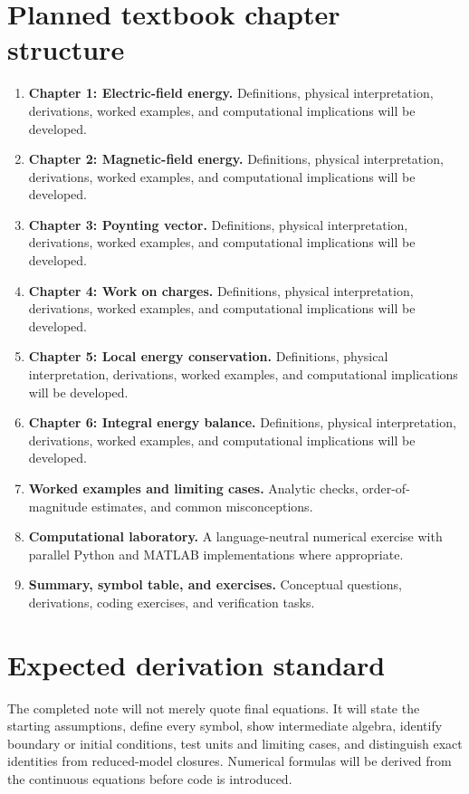 \documentclass[11pt]{article}
\begin{document}
\section{Planned textbook chapter structure}
\begin{enumerate}[leftmargin=1.8em]
\item \textbf{Chapter 1: Electric-field energy.} Definitions, physical interpretation, derivations, worked examples, and computational implications will be developed.
\item \textbf{Chapter 2: Magnetic-field energy.} Definitions, physical interpretation, derivations, worked examples, and computational implications will be developed.
\item \textbf{Chapter 3: Poynting vector.} Definitions, physical interpretation, derivations, worked examples, and computational implications will be developed.
\item \textbf{Chapter 4: Work on charges.} Definitions, physical interpretation, derivations, worked examples, and computational implications will be developed.
\item \textbf{Chapter 5: Local energy conservation.} Definitions, physical interpretation, derivations, worked examples, and computational implications will be developed.
\item \textbf{Chapter 6: Integral energy balance.} Definitions, physical interpretation, derivations, worked examples, and computational implications will be developed.
\item \textbf{Worked examples and limiting cases.} Analytic checks, order-of-magnitude estimates, and common misconceptions.
\item \textbf{Computational laboratory.} A language-neutral numerical exercise with parallel Python and MATLAB implementations where appropriate.
\item \textbf{Summary, symbol table, and exercises.} Conceptual questions, derivations, coding exercises, and verification tasks.
\end{enumerate}

\section{Expected derivation standard}
The completed note will not merely quote final equations. It will state the starting assumptions, define every symbol, show intermediate algebra, identify boundary or initial conditions, test units and limiting cases, and distinguish exact identities from reduced-model closures. Numerical formulas will be derived from the continuous equations before code is introduced.
\end{document}
